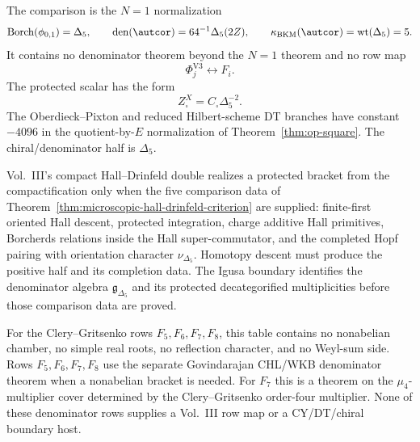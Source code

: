 The comparison is the \(N=1\) normalization
\[
\operatorname{Borch}(\phi_{0,1})=\Delta_5,\qquad
\operatorname{den}(\autcor)=64^{-1}\Delta_5(2Z),\qquad
\kappa_{\mathrm{BKM}}(\autcor)=\mathrm{wt}(\Delta_5)=5.
\]
It contains no denominator theorem beyond the \(N=1\) theorem and no row
map
\[
\Phi^{\mathrm{V3}}_j\longleftrightarrow F_i.
\]
The protected scalar has the form
\[
Z^X_{\square}=C_{\square}\Delta_5^{-2}.
\]
The Oberdieck--Pixton and reduced Hilbert-scheme DT branches have
constant \(-4096\) in the quotient-by-\(E\) normalization of
Theorem~\ref{thm:op-square}.  The chiral/denominator half is
\(\Delta_5\).

Vol.~III's compact Hall--Drinfeld double realizes a protected bracket
from the compactification only when the five comparison data of
Theorem~\ref{thm:microscopic-hall-drinfeld-criterion} are supplied:
finite-first oriented Hall descent, protected integration, charge
additive Hall primitives, Borcherds relations inside the Hall
super-commutator, and the completed Hopf pairing with orientation
character \(\nu_{\Delta_5}\).  Homotopy descent must produce the
positive half and its completion data.  The Igusa boundary identifies
the denominator algebra \(\mathfrak g_{\Delta_5}\) and its protected
decategorified multiplicities before those comparison data are proved.

For the Clery--Gritsenko rows \(F_5,F_6,F_7,F_8\), this table contains
no nonabelian chamber, no simple real roots, no reflection character,
and no Weyl-sum side.  Rows \(F_5,F_6,F_7,F_8\) use the separate
Govindarajan CHL/WKB denominator theorem when a nonabelian bracket is
needed.  For \(F_7\) this is a theorem on the \(\mu_4\)-multiplier cover
determined by the Clery--Gritsenko order-four multiplier.  None of these
denominator rows supplies a Vol.~III row map or a CY/DT/chiral boundary
host.

